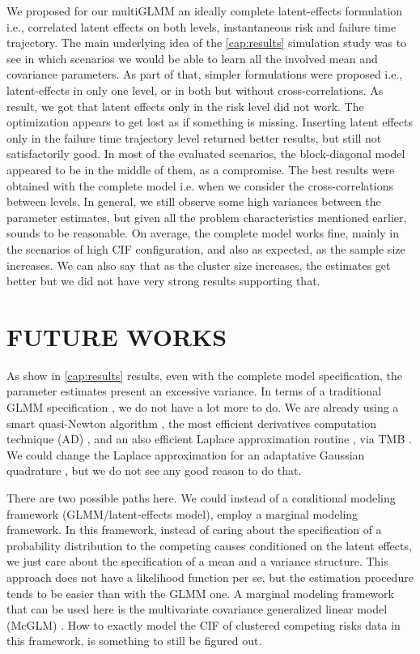 We proposed for our multiGLMM an ideally complete latent-effects
formulation i.e., correlated latent effects on both levels,
instantaneous risk and failure time trajectory. The main underlying idea
of the \autoref{cap:results} simulation study was to see in which
scenarios we would be able to learn all the involved mean and covariance
parameters. As part of that, simpler formulations were proposed i.e.,
latent-effects in only one level, or in both but without
cross-correlations. As result, we got that latent effects only in the
risk level did not work. The optimization appears to get lost as if
something is missing. Inserting latent effects only in the failure time
trajectory level returned better results, but still not satisfactorily
good. In most of the evaluated scenarios, the block-diagonal model
appeared to be in the middle of them, as a compromise. The best results
were obtained with the complete model i.e. when we consider the
cross-correlations between levels. In general, we still observe some
high variances between the parameter estimates, but given all the
problem characteristics mentioned earlier, sounds to be reasonable. On
average, the complete model works fine, mainly in the scenarios of high
CIF configuration, and also as expected, as the sample size
increases. We can also say that as the cluster size increases, the
estimates get better but we did not have very strong results supporting
that.

\section{FUTURE WORKS}
\label{cap:future}

As show in \autoref{cap:results} results, even with the complete model
specification, the parameter estimates present an excessive variance.
In terms of a traditional GLMM specification \cite{GLMM}, we do not have
a lot more to do. We are already using a smart quasi-Newton algorithm
\cite{PORTpaper}, the most efficient derivatives computation technique
(AD) \cite{peyre}, and an also efficient Laplace approximation routine
\cite{corestats, patrao}, via TMB \cite{TMB}. We could change the
Laplace approximation for an adaptative Gaussian quadrature
\cite{quadrature}, but we do not see any good reason to do that.

There are two possible paths here. We could instead of a conditional
modeling framework (GLMM/latent-effects model), employ a marginal
modeling framework. In this framework, instead of caring about the
specification of a probability distribution to the competing causes
conditioned on the latent effects, we just care about the specification
of a mean and a variance structure. This approach does not have a
likelihood function per se, but the estimation procedure tends to be
easier than with the GLMM one. A marginal modeling framework that can be
used here is the multivariate covariance generalized linear model
(McGLM) \cite{mcglm, rmcglm}. How to exactly model the CIF of clustered
competing risks data in this framework, is something to still be figured
out.


